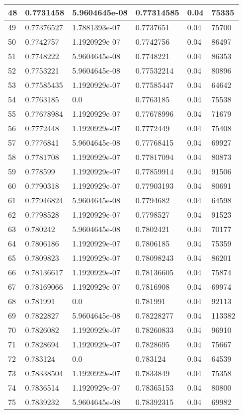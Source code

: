 \begin{longtable}{|l|l|l|l|l|l|}
48 & 0.7731458 & 5.9604645e-08 & 0.77314585 & 0.04 & 75335 \\ \hline 
49 & 0.77376527 & 1.7881393e-07 & 0.7737651 & 0.04 & 75700 \\ \hline 
50 & 0.7742757 & 1.1920929e-07 & 0.7742756 & 0.04 & 86497 \\ \hline 
51 & 0.7748222 & 5.9604645e-08 & 0.7748221 & 0.04 & 86353 \\ \hline 
52 & 0.7753221 & 5.9604645e-08 & 0.77532214 & 0.04 & 80896 \\ \hline 
53 & 0.77585435 & 1.1920929e-07 & 0.77585447 & 0.04 & 64642 \\ \hline 
54 & 0.7763185 & 0.0 & 0.7763185 & 0.04 & 75538 \\ \hline 
55 & 0.77678984 & 1.1920929e-07 & 0.77678996 & 0.04 & 71679 \\ \hline 
56 & 0.7772448 & 1.1920929e-07 & 0.7772449 & 0.04 & 75408 \\ \hline 
57 & 0.7776841 & 5.9604645e-08 & 0.77768415 & 0.04 & 69927 \\ \hline 
58 & 0.7781708 & 1.1920929e-07 & 0.77817094 & 0.04 & 80873 \\ \hline 
59 & 0.778599 & 1.1920929e-07 & 0.77859914 & 0.04 & 91506 \\ \hline 
60 & 0.7790318 & 1.1920929e-07 & 0.77903193 & 0.04 & 80691 \\ \hline 
61 & 0.77946824 & 5.9604645e-08 & 0.7794682 & 0.04 & 64598 \\ \hline 
62 & 0.7798528 & 1.1920929e-07 & 0.7798527 & 0.04 & 91523 \\ \hline 
63 & 0.780242 & 5.9604645e-08 & 0.7802421 & 0.04 & 70177 \\ \hline 
64 & 0.7806186 & 1.1920929e-07 & 0.7806185 & 0.04 & 75359 \\ \hline 
65 & 0.7809823 & 1.1920929e-07 & 0.78098243 & 0.04 & 86201 \\ \hline 
66 & 0.78136617 & 1.1920929e-07 & 0.78136605 & 0.04 & 75874 \\ \hline 
67 & 0.78169066 & 1.1920929e-07 & 0.7816908 & 0.04 & 69974 \\ \hline 
68 & 0.781991 & 0.0 & 0.781991 & 0.04 & 92113 \\ \hline 
69 & 0.7822827 & 5.9604645e-08 & 0.78228277 & 0.04 & 113382 \\ \hline 
70 & 0.7826082 & 1.1920929e-07 & 0.78260833 & 0.04 & 96910 \\ \hline 
71 & 0.7828694 & 1.1920929e-07 & 0.7828695 & 0.04 & 75667 \\ \hline 
72 & 0.783124 & 0.0 & 0.783124 & 0.04 & 64539 \\ \hline 
73 & 0.78338504 & 1.1920929e-07 & 0.7833849 & 0.04 & 75358 \\ \hline 
74 & 0.7836514 & 1.1920929e-07 & 0.78365153 & 0.04 & 80800 \\ \hline 
75 & 0.7839232 & 5.9604645e-08 & 0.78392315 & 0.04 & 69982 \\ \hline 
\end{longtable}